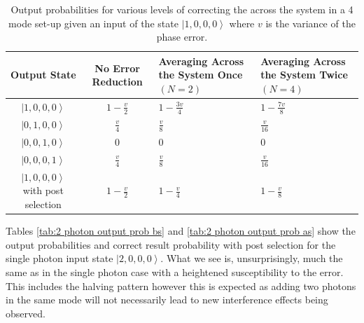 \documentclass[aps,pra,twocolumn,superscriptaddress,numerical]{revtex4-1}
\begin{document}
\begin{widetext}
\begin{table}
{		\begin{centering}
			\begin{tabular}{|c|c|>{\centering}p{4cm}|>{\centering}p{4cm}|}
				\hline 
				Output State & No Error Reduction & Averaging Across the System Once $\left(N=2\right)$ & Averaging Across the System Twice $\left(N=4\right)$\tabularnewline
				\hline 
				\hline 
				$\left|1,0,0,0\right\rangle $ & $1-\frac{v}{2}$ & $1-\frac{3v}{4}$ & $1-\frac{7v}{8}$\tabularnewline
				\hline 
				$\left|0,1,0,0\right\rangle $ & $\frac{v}{4}$ & $\frac{v}{8}$ & $\frac{v}{16}$\tabularnewline
				\hline 
				$\left|0,0,1,0\right\rangle $ & $0$ & $0$ & $0$\tabularnewline
				\hline 
				$\left|0,0,0,1\right\rangle $ & $\frac{v}{4}$ & $\frac{v}{8}$ & $\frac{v}{16}$\tabularnewline
				\hline 
				$\left|1,0,0,0\right\rangle $ with post selection & $1-\frac{v}{2}$ & $1-\frac{v}{4}$ & $1-\frac{v}{8}$\tabularnewline
				\hline 
			\end{tabular}
			\par\end{centering}
		
	}
	
	\caption[Output probabilities for various levels of correcting the across the
	system in a 4 mode set-up given an input of the state $\left|1,0,0,0\right\rangle $.]{Output probabilities for various levels of correcting the across
		the system in a 4 mode set-up given an input of the state $\left|1,0,0,0\right\rangle $
		where $v$ is the variance of the phase error. \label{tab:1 photon output prob as}}
\end{table}


Tables \ref{tab:2 photon output prob bs} and \ref{tab:2 photon output prob as}
show the output probabilities and correct result probability with
post selection for the single photon input state $\left|2,0,0,0\right\rangle $.
What we see is, unsurprisingly, much the same as in the single photon
case with a heightened susceptibility to the error. This includes
the halving pattern however this is expected as adding two photons
in the same mode will not necessarily lead to new interference effects
being observed.

\begin{table}
	\resizebox{\textwidth}{!}{
		
}
\end{table}
\end{widetext}
\end{document}
